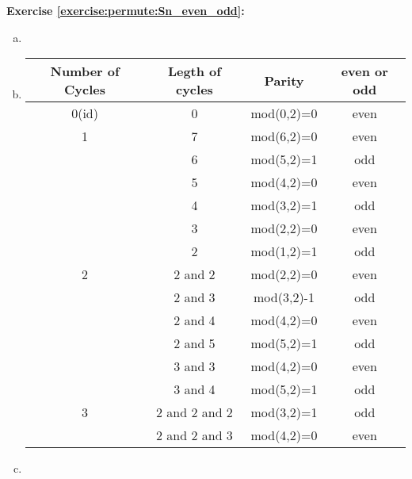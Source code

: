 \noindent\textbf{Exercise  \ref{exercise:permute:Sn_even_odd}:}%
\begin{enumerate}[(a)]
\item
\item
\begin{tabular}{|c|c|c|c|}
	\hline
	Number of Cycles & Legth of cycles & Parity & even or odd \\
 	\hline
  	0(id) & 0 & mod(0,2)=0 & even\\
  	\hline
 	1 & 7 & mod(6,2)=0 & even\\
  	& 6 & mod(5,2)=1 & odd\\
  	& 5 & mod(4,2)=0 & even\\
  	& 4 & mod(3,2)=1 & odd\\
  	& 3 & mod(2,2)=0 & even\\
  	& 2 & mod(1,2)=1 & odd\\
  	\hline
  	2 & 2 and 2 & mod(2,2)=0 & even\\
   & 2 and 3 & mod(3,2)-1 & odd\\
   & 2 and 4 & mod(4,2)=0 & even\\
   & 2 and 5 & mod(5,2)=1 & odd\\
   & 3 and 3 & mod(4,2)=0 & even\\
   & 3 and 4 & mod(5,2)=1 & odd\\
   \hline
  	3 & 2 and 2 and 2 & mod(3,2)=1 & odd\\
   & 2 and 2 and 3 & mod(4,2)=0 & even\\
   \hline
\end{tabular}

\item
\end{enumerate}

